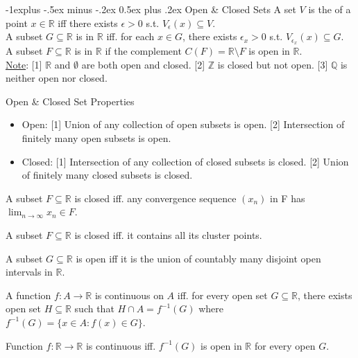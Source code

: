 \documentclass[10pt,landscape,letterpaper]{article}
\makeatletter
\renewcommand{\subsection}{\@startsection{subsection}{2}{0mm}%
                                {-1explus -.5ex minus -.2ex}%
                                {0.5ex plus .2ex}%
                                {\sffamily\normalsize\itshape}}
\makeatother
\begin{document}
\begin{multicols}{3}
\subsection{Open \& Closed Sets}
A set $V$ is the  of a point $x \in \mathbb{R}$ iff there exists $\epsilon > 0$ s.t. $V_\epsilon(x) \subseteq V$.
\\
A subset $G \subseteq \mathbb{R}$ is  in $\mathbb{R}$ iff. for each $x \in G$, there exists $\epsilon_x > 0$ s.t. $V_{\epsilon_x}(x) \subseteq G$.
\\
A subset $F \subseteq \mathbb{R}$ is  in $\mathbb{R}$ if the complement $C(F) = \mathbb{R} \setminus F$ is open in $\mathbb{R}$.
\\
\underline{Note}: [1] $\mathbb{R}$ and $\emptyset$ are both open and closed. [2] $\mathbb{Z}$ is closed but not open. [3] $\mathbb{Q}$ is neither open nor closed.


Open \& Closed Set Properties
\begin{itemize}
    \item Open: [1] Union of any collection of open subsets is open. [2] Intersection of finitely many open subsets is open.
    \item Closed: [1] Intersection of any collection of closed subsets is closed. [2] Union of finitely many closed subsets is closed.
\end{itemize}


 A subset $F \subseteq \mathbb{R}$ is closed iff. any convergence sequence $(x_n)$ in F has $\lim_{n \to \infty} x_n \in F$.


 A subset $F \subseteq \mathbb{R}$ is closed iff. it contains all its cluster points.

 A subset $G \subseteq \mathbb{R}$ is open iff it is the union of countably many disjoint open intervals in $\mathbb{R}$.


\smallbreak


 A function $f: A \to \mathbb{R}$ is continuous on $A$ iff. for every open set $G \subseteq \mathbb{R}$, there exists open set $H \subseteq \mathbb{R}$ such that $H \cap A = f^{-1}(G)$ where $f^{-1}(G) = \{ x \in A: f(x) \in G \}$.

 Function $f: \mathbb{R} \to \mathbb{R}$ is continuous iff. $f^{-1}(G)$ is open in $\mathbb{R}$ for every open $G$.




\end{multicols}
\end{document}
